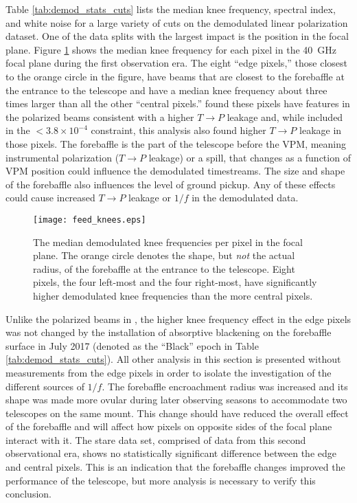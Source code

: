 \documentclass[twocolumn, tighten, numberedappendix, twocolappendix]{aastex63}
\begin{document}


%

Table \ref{tab:demod_stats_cuts} lists the median knee frequency, spectral index, and white noise for a large variety of cuts on the demodulated linear polarization dataset. One of the data splits with the largest impact is the position in the focal plane. Figure \ref{fig:feed_knees} shows the median knee frequency for each pixel in the 40~GHz focal plane during the first observation era. The eight ``edge pixels,'' those closest to the orange circle in the figure, have beams that are closest to the forebaffle at the entrance to the telescope and have a median knee frequency about three times larger than all the other ``central pixels.'' \cite{xu20} found these pixels have features in the polarized beams consistent with a higher $T\rightarrow P$ leakage and, while included in the $<3.8\times10^{-4}$ constraint, this analysis also found higher $T\rightarrow P$ leakage in those pixels. The forebaffle is the part of the telescope before the VPM, meaning instrumental polarization ($T\rightarrow P$ leakage) or a spill, that changes as a function of VPM position could influence the demodulated timestreams. The size and shape of the forebaffle also influences the level of ground pickup. Any of these effects could cause increased $T\rightarrow P$ leakage or $1/f$ in the demodulated data. 

\begin{figure}
    \centering
    \texttt{[image: feed\_knees.eps]}
    \caption{The median demodulated knee frequencies per pixel in the focal plane. The orange circle denotes the shape, but \textit{not} the actual radius, of the forebaffle at the entrance to the telescope. Eight pixels, the four left-most and the four right-most, have significantly higher demodulated knee frequencies than the more central pixels.}
    \label{fig:feed_knees}
\end{figure}

Unlike the polarized beams in \cite{xu20}, the higher knee frequency effect in the edge pixels was not changed by the installation of absorptive blackening on the forebaffle surface in July 2017 (denoted as the ``Black'' epoch in Table \ref{tab:demod_stats_cuts}). All other analysis in this section is presented without measurements from the edge pixels in order to isolate the investigation of the different sources of $1/f$. The forebaffle encroachment radius was increased and its shape was made more ovular during later observing seasons to accommodate two telescopes on the same mount. This change should have reduced the overall effect of the forebaffle and will affect how pixels on opposite sides of the focal plane interact with it. The stare data set, comprised of data from this second observational era, shows no statistically significant difference between the edge and central pixels. This is an indication that the forebaffle changes improved the performance of the telescope, but more analysis is necessary to verify this conclusion. 
\end{document}
